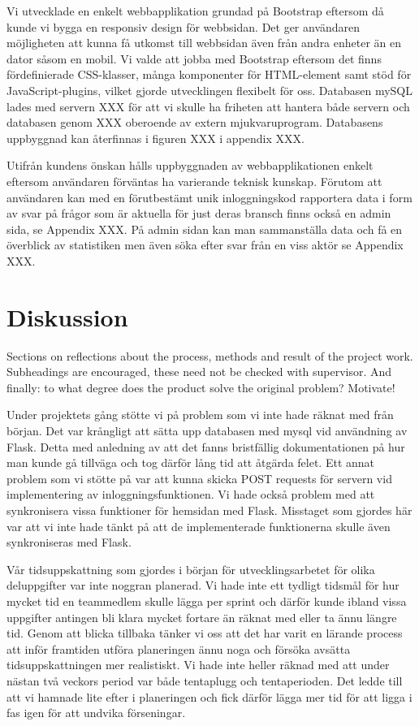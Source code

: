 \documentclass[12pt]{article}
\begin{document}
Vi utvecklade en enkelt webbapplikation grundad på Bootstrap eftersom då kunde vi bygga en responsiv design för webbsidan. Det ger användaren möjligheten att kunna få utkomst till webbsidan även från andra enheter än en dator såsom en mobil. Vi valde att jobba med Bootstrap eftersom det finns fördefinierade CSS-klasser, många komponenter för HTML-element samt stöd för JavaScript-plugins, vilket gjorde utvecklingen flexibelt för oss. Databasen mySQL lades med servern XXX för att vi skulle ha friheten att hantera både servern och databasen genom XXX oberoende av extern mjukvaruprogram. Databasens uppbyggnad kan återfinnas i figuren XXX i appendix XXX. 


Utifrån kundens önskan hålls uppbyggnaden av webbapplikationen enkelt eftersom användaren förväntas ha varierande teknisk kunskap. Förutom att användaren kan med en förutbestämt unik inloggningskod rapportera data i form av svar på frågor som är aktuella för just deras bransch finns också en admin sida, se Appendix XXX. På admin sidan kan man sammanställa data och få en överblick av statistiken men även söka efter svar från en viss aktör se Appendix XXX. 

\section{Diskussion}
Sections on reflections about the process, methods and result of the project work. Subheadings are encouraged, these need not be checked with supervisor. And finally: to what degree does the product solve the original problem? Motivate!

Under projektets gång stötte vi på problem som vi inte hade räknat med från början. Det var krångligt att sätta upp databasen med mysql vid användning av Flask. Detta med anledning av att det fanns bristfällig dokumentationen på hur man kunde gå tillväga och tog därför lång tid att åtgärda felet. Ett annat problem som vi stötte på var att kunna skicka POST requests för servern vid implementering av inloggningsfunktionen. Vi hade också problem med att synkronisera vissa funktioner för hemsidan med Flask. Misstaget som gjordes här var att vi inte hade tänkt på att de implementerade funktionerna skulle även synkroniseras med Flask. 

Vår tidsuppskattning som gjordes i början för utvecklingsarbetet för olika deluppgifter var inte noggran planerad. Vi hade inte ett tydligt tidsmål för hur mycket tid en teammedlem skulle lägga per sprint och därför kunde ibland vissa uppgifter antingen bli klara mycket fortare än räknat med eller ta ännu längre tid. Genom att blicka tillbaka tänker vi oss att det har varit en lärande process att inför framtiden utföra planeringen ännu noga och försöka avsätta tidsuppskattningen mer realistiskt. Vi hade inte heller räknad med att under nästan två veckors period var både tentaplugg och tentaperioden. Det ledde till att vi hamnade lite efter i planeringen och fick därför lägga mer tid för att ligga i fas igen för att undvika förseningar. 
\end{document}
